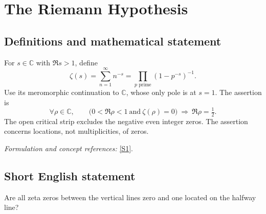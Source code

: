 \documentclass[11pt]{article}
\newcommand{\C}{\mathbb{C}}
\newcommand{\sref}[2]{\hyperlink{source:#1:#2}{[S#2]}}
\newif\ifshowcatalogue
\newcommand{\cataloguescope}[1]{\ifshowcatalogue
 \paragraph{Exact scope in the supplied catalogue.}
 \begin{quote}\small #1\end{quote}\fi}
\begin{document}
\setcounter{section}{0}
\clearpage
\section*{\texorpdfstring{The Riemann Hypothesis}{The Riemann Hypothesis}}\label{2}
\subsection{Definitions and mathematical statement}
For $s\in\C$ with $\Re s>1$, define
\[
 \zeta(s)=\sum_{n=1}^{\infty}n^{-s}=\prod_{p\text{ prime}}(1-p^{-s})^{-1}.
\]
Use its meromorphic continuation to $\C$, whose only pole is at $s=1$. The assertion is
\[
 \forall\rho\in\C,\qquad \bigl(0<\Re\rho<1\ \text{and}\ \zeta(\rho)=0\bigr)
 \ \Longrightarrow\ \Re\rho=\tfrac12.
\]
The open critical strip excludes the negative even integer zeros. The assertion concerns locations, not multiplicities, of zeros.
\par\smallskip\textit{Formulation and concept references:} \sref{2}{1}.
\cataloguescope{For the meromorphic continuation of the Riemann zeta function zeta(s)=sum\_\{n>=1\} n\textasciicircum{}(-s), initially defined for Re(s)>1, every zero s in the open critical strip 0<Re(s)<1 has Re(s)=1/2. This is the Riemann Hypothesis for zeta alone; it does not assert simplicity of its zeros.}
\subsection{Short English statement}
Are all zeta zeros between the vertical lines zero and one located on the halfway line?
\end{document}
